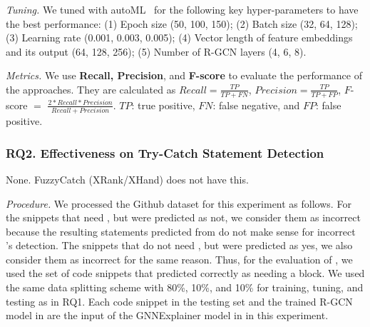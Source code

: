 
{\em Tuning.} We tuned {\tool} with autoML~\cite{NNI} for the
following key hyper-parameters to have the best performance: (1) Epoch
size (50, 100, 150); (2) Batch size (32, 64, 128); (3) Learning rate
(0.001, 0.003, 0.005); (4) Vector length of feature embeddings and its
output (64, 128, 256); (5) Number of R-GCN layers (4, 6, 8).

{\em Metrics.} We use \textbf{Recall, Precision}, and {\bf F-score} to
evaluate the performance of the approaches. They are calculated as
$Recall = \frac{TP}{TP+FN}$, $Precision = \frac{TP}{TP+FP}$, $F$-score
$=$ $\frac{2*Recall*Precision}{Recall+Precision}$. $TP$: true
positive, $FN$: false negative, and $FP$: false positive.

\subsubsection{RQ2. Effectiveness on Try-Catch Statement Detection\\}

 None. FuzzyCatch (XRank/XHand) does not have
this.

{\em Procedure.} We processed the Github dataset for this experiment
as follows. For the snippets that need , but were
predicted as not, we consider them as incorrect because the resulting
statements predicted from {\xstate} do not make sense for incorrect
{\xblock}'s detection. The snippets that do not need ,
but were predicted as yes, we also consider them as incorrect for the
same reason. Thus, for the evaluation of {\xstate}, we used the set of
code snippets that {\xblock} predicted correctly as needing a
 block. We used the same data splitting scheme with
80\%, 10\%, and 10\% for training, tuning, and testing as in RQ1. Each code
snippet in the testing set and the trained R-GCN model in {\xblock}
are the input of the GNNExplainer model in {\xstate} in this
experiment.


